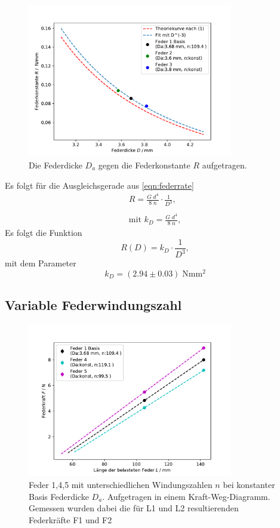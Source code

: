 \begin{figure}[H]
  \center
  \includegraphics[width=0.8\textwidth]{plots/dicke_konstante_dia.pdf}
  \caption{Die Federdicke $D_a$ gegen die Federkonstante $R$ aufgetragen.}
  \label{fig:R_D_dia}
\end{figure}

Es folgt für die Ausgleichsgerade aus \ref{eqn:federrate}
\begin{align*}
  R=\frac{G\;d^4}{8\;n}\cdot \frac{1}{D^3}, \\\\  
  \text{mit }k_D =\frac{G\;d^4}{8\;n},
\end{align*}
Es folgt die Funktion
\begin{equation*}
  R(D)=k_D \cdot \frac{1}{D^3},
\end{equation*}
mit dem Parameter
\begin{equation*}
  k_D=(2.94 \pm 0.03) \;\si{\N\mm\squared}
\end{equation*}


\subsection{Variable Federwindungszahl}
\label{sec:federwindungen}
\begin{figure}[H]
    \center
    \includegraphics[width=0.8\textwidth]{plots/n_kraftweg_dia.pdf}
    \caption{Feder 1,4,5 mit unterschiedlichen Windungszahlen $n$ bei konstanter Basis Federdicke $D_a$.
    Aufgetragen in einem Kraft-Weg-Diagramm. Gemessen wurden dabei die für L1
    und L2 resultierenden Federkräfte F1 und F2}
\end{figure}


